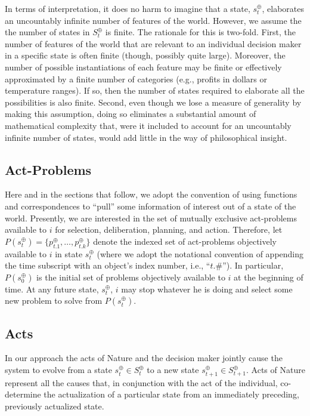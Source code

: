 \documentclass[
11pt,
titlepage,
reqno,
]{article}%
\theoremstyle{definition}
\begin{document}
	
	In terms of interpretation, it does no harm to imagine that a state, $s^\oplus_t$, elaborates an uncountably infinite number of features of the world.
	However,  we assume the the number of states in $S^\oplus_t$ is finite.
	The rationale for this is two-fold.
	First, the number of features of the world that are relevant to an individual decision maker in a specific state is often finite (though, possibly quite large).
	Moreover, the number of possible instantiations of each feature may be finite or effectively approximated by a finite number of  categories (e.g., profits in dollars or temperature ranges).
	If so, then the number of states required to elaborate all the possibilities is also finite.
	Second, even  though we lose a measure of generality by making this assumption, doing so eliminates a substantial amount of mathematical complexity that, were it included to account for an uncountably infinite number of states, would add little in the way of philosophical insight.
	
	\subsection{Act-Problems}\label{sec:problems}
	Here and in the sections that follow, we adopt the convention of using functions and correspondences to ``pull'' some information of interest out of a state of the world. 
	Presently, we are interested in the set of mutually exclusive act-problems available to $i$ for selection, deliberation, planning, and action.
	Therefore, let $P(s^\oplus_t)=\{p^\oplus_{t.1},\ldots,p^\oplus_{t.k}\}$ denote the indexed set of act-problems objectively available to $i$ in state $s^\oplus_t$ (where we adopt the notational convention of appending the time subscript with an object's index number, i.e., ``$t.\#$'').
	In particular, $P(s^\oplus_0)$ is the initial set of problems objectively available to $i$ at the beginning of time. 
	At any future state, $s^\oplus_t$, $i$ may stop whatever he is doing and select some new problem to solve from $P(s^\oplus_t)$. 
	
	
	\subsection{Acts}\label{sec:acts}
	
	In our approach the acts of Nature and the decision maker jointly cause the system to evolve from a state $s^\oplus_t\in S^\oplus_t$ to a new state $s^\oplus_{t+1}\in S^\oplus_{t+1}$.
	Acts of Nature represent all the causes that, in conjunction with the act of the individual, co-determine the actualization of a particular state from an immediately preceding, previously actualized state.
	
\end{document}
